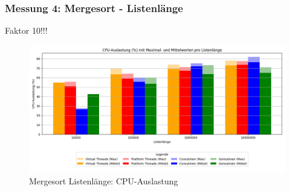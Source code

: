 \documentclass[fontsize=12pt,paper=a4,twoside=semi,parskip=half-,headsepline,headinclude]{scrreprt}
\begin{document}
\subsubsection{Messung 4: Mergesort - Listenlänge}

Faktor 10!!!

\begin{figure}[H]
	\centering
	\includegraphics[scale=0.5]{figures/mergesort/Listenlaenge/cpu_usage_bar_plot.png}
	\caption{Mergesort Listenlänge: CPU-Auslastung}
	\label{fig:mslaengeCPU}
\end{figure}
\end{document}
